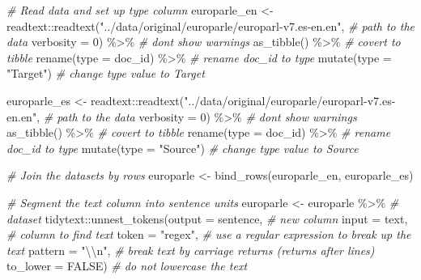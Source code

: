 \documentclass[
]{article}
\newenvironment{Shaded}{\begin{snugshade}}{\end{snugshade}}
\newcommand{\AttributeTok}[1]{\textcolor[rgb]{0.77,0.63,0.00}{#1}}
\newcommand{\CommentTok}[1]{\textcolor[rgb]{0.56,0.35,0.01}{\textit{#1}}}
\newcommand{\ConstantTok}[1]{\textcolor[rgb]{0.00,0.00,0.00}{#1}}
\newcommand{\DecValTok}[1]{\textcolor[rgb]{0.00,0.00,0.81}{#1}}
\newcommand{\FunctionTok}[1]{\textcolor[rgb]{0.00,0.00,0.00}{#1}}
\newcommand{\NormalTok}[1]{#1}
\newcommand{\OtherTok}[1]{\textcolor[rgb]{0.56,0.35,0.01}{#1}}
\newcommand{\SpecialCharTok}[1]{\textcolor[rgb]{0.00,0.00,0.00}{#1}}
\newcommand{\StringTok}[1]{\textcolor[rgb]{0.31,0.60,0.02}{#1}}
\begin{document}
\begin{Shaded}
\begin{Highlighting}[]
\CommentTok{\# Read data and set up \textasciigrave{}type\textasciigrave{} column}
\NormalTok{europarle\_en }\OtherTok{\textless{}{-}}  
\NormalTok{  readtext}\SpecialCharTok{::}\FunctionTok{readtext}\NormalTok{(}\StringTok{"../data/original/europarle/europarl{-}v7.es{-}en.en"}\NormalTok{, }\CommentTok{\# path to the data}
                     \AttributeTok{verbosity =} \DecValTok{0}\NormalTok{) }\SpecialCharTok{\%\textgreater{}\%} \CommentTok{\# don\textquotesingle{}t show warnings}
  \FunctionTok{as\_tibble}\NormalTok{() }\SpecialCharTok{\%\textgreater{}\%} \CommentTok{\# covert to tibble}
  \FunctionTok{rename}\NormalTok{(}\AttributeTok{type =}\NormalTok{ doc\_id) }\SpecialCharTok{\%\textgreater{}\%} \CommentTok{\# rename doc\_id to type}
  \FunctionTok{mutate}\NormalTok{(}\AttributeTok{type =} \StringTok{"Target"}\NormalTok{) }\CommentTok{\# change type value to \textquotesingle{}Target\textquotesingle{}}

\NormalTok{europarle\_es }\OtherTok{\textless{}{-}} 
\NormalTok{  readtext}\SpecialCharTok{::}\FunctionTok{readtext}\NormalTok{(}\StringTok{"../data/original/europarle/europarl{-}v7.es{-}en.en"}\NormalTok{, }\CommentTok{\# path to the data}
                     \AttributeTok{verbosity =} \DecValTok{0}\NormalTok{) }\SpecialCharTok{\%\textgreater{}\%}  \CommentTok{\# don\textquotesingle{}t show warnings}
  \FunctionTok{as\_tibble}\NormalTok{() }\SpecialCharTok{\%\textgreater{}\%} \CommentTok{\# covert to tibble}
  \FunctionTok{rename}\NormalTok{(}\AttributeTok{type =}\NormalTok{ doc\_id) }\SpecialCharTok{\%\textgreater{}\%} \CommentTok{\# rename doc\_id to type}
  \FunctionTok{mutate}\NormalTok{(}\AttributeTok{type =} \StringTok{"Source"}\NormalTok{) }\CommentTok{\# change type value to \textquotesingle{}Source\textquotesingle{}}

\CommentTok{\# Join the datasets by rows}
\NormalTok{europarle }\OtherTok{\textless{}{-}} 
  \FunctionTok{bind\_rows}\NormalTok{(europarle\_en, europarle\_es)}

\CommentTok{\# Segment the \textasciigrave{}text\textasciigrave{} column into \textasciigrave{}sentence\textasciigrave{} units}
\NormalTok{europarle }\OtherTok{\textless{}{-}} 
\NormalTok{  europarle }\SpecialCharTok{\%\textgreater{}\%} \CommentTok{\# dataset}
\NormalTok{  tidytext}\SpecialCharTok{::}\FunctionTok{unnest\_tokens}\NormalTok{(}\AttributeTok{output =}\NormalTok{ sentence, }\CommentTok{\# new column}
                          \AttributeTok{input =}\NormalTok{ text, }\CommentTok{\# column to find text}
                          \AttributeTok{token =} \StringTok{"regex"}\NormalTok{, }\CommentTok{\# use a regular expression to break up the text}
                          \AttributeTok{pattern =} \StringTok{"}\SpecialCharTok{\textbackslash{}\textbackslash{}}\StringTok{n"}\NormalTok{, }\CommentTok{\# break text by carriage returns (returns after lines)}
                          \AttributeTok{to\_lower =} \ConstantTok{FALSE}\NormalTok{) }\CommentTok{\# do not lowercase the text}


\end{Highlighting}
\end{Shaded}
\end{document}

